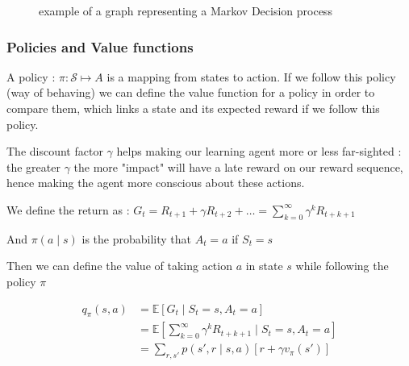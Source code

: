 \documentclass[14pt,a4paper]{article}
\theoremstyle{definition}
\begin{document}
\begin{figure}[H]
\centering
    \label{figure : graph_example}
        \caption{example of a graph representing a Markov Decision process}
\end{figure}  




\subsubsection{Policies and Value functions}

A policy : $\pi : \mathcal{S} \mapsto A $ is a mapping from states to action. If we follow this policy (way of behaving) we can define the value function for a policy in order to compare them, which links a state and its expected reward if we follow this policy.

The discount factor $\gamma $ helps making our learning agent more or less far-sighted : the greater $\gamma $ the more "impact" will have a late reward on our reward sequence, hence making the agent more conscious about these actions.

We define the return as : $G_t= R_{t+1}+\gamma R_{t+2}+ \dots = \sum_{k=0}^{\infty}\gamma^{k}R_{t+k+1} $

And $\pi(a\mid s) $ is the probability that $A_t=a$ if $S_t=s$

Then we can define the value of taking action $a$ in state $s$ while following the policy $\pi$ 

\begin{equation}
\begin{split}
q_{\pi}(s,a)&= \mathbb{E}[G_t\mid S_t=s, A_t=a]
\\&=\mathbb{E}[\sum_{k=0}^{\infty}\gamma^{k}R_{t+k+1}\mid S_t=s,A_t=a]
\\&= \sum_{r,s'}p(s',r\mid s,a)[r+\gamma v_{\pi}(s')]
\end{split}
\label{q(s,a)}
\end{equation}
\end{document}
